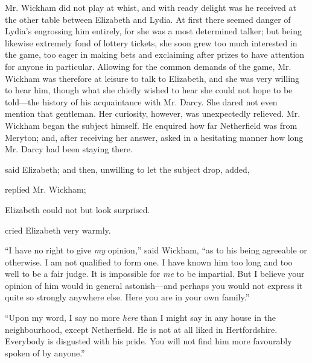 Mr. Wickham did not play at whist, and with ready delight was he received at the other table between Elizabeth and Lydia. At first there seemed danger of Lydia's engrossing him entirely, for she was a most determined talker; but being likewise extremely fond of lottery tickets, she soon grew too much interested in the game, too eager in making bets and exclaiming after prizes to have attention for anyone in particular. Allowing for the common demands of the game, Mr. Wickham was therefore at leisure to talk to Elizabeth, and she was very willing to hear him, though what she chiefly wished to hear she could not hope to be told---the history of his acquaintance with Mr. Darcy. She dared not even mention that gentleman. Her curiosity, however, was unexpectedly relieved. Mr. Wickham began the subject himself. He enquired how far Netherfield was from Meryton; and, after receiving her answer, asked in a hesitating manner how long Mr. Darcy had been staying there.

 said Elizabeth; and then, unwilling to let the subject drop, added, 

 replied Mr. Wickham; 

Elizabeth could not but look surprised.


 cried Elizabeth very warmly. 

“I have no right to give {\em my} opinion,” said Wickham, “as to his being agreeable or otherwise. I am not qualified to form one. I have known him too long and too well to be a fair judge. It is impossible for {\em me} to be impartial. But I believe your opinion of him would in general astonish---and perhaps you would not express it quite so strongly anywhere else. Here you are in your own family.”

“Upon my word, I say no more {\em here} than I might say in any house in the neighbourhood, except Netherfield. He is not at all liked in Hertfordshire. Everybody is disgusted with his pride. You will not find him more favourably spoken of by anyone.”

